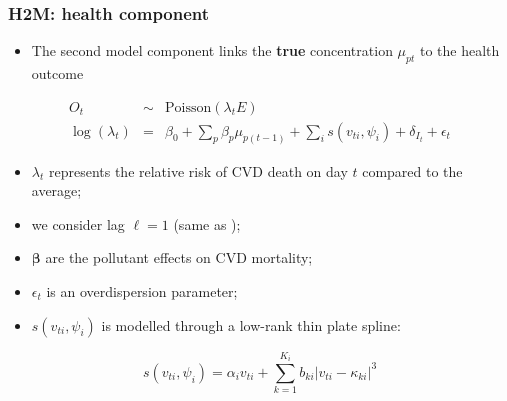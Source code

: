 \documentclass[slidestop,compress,serif,10pt]{beamer}
\begin{document}
\begin{frame}
\frametitle{H2M: health component}
\begin{itemize}
\item The second model component links the \textbf{true} concentration $\mu_{pt}$ to the health outcome
\end{itemize}
\begin{eqnarray*}
O_t &\sim& \text{Poisson}(\lambda_t E)\\
\log(\lambda_{t})&=& \beta_0 + \sum_p \beta_p \mu_{p(t-1)} + \sum_i s(v_{ti}, \psi_i) + \delta_{I_t} + \epsilon_t
\end{eqnarray*}

\begin{itemize}
\item $\lambda_t$ represents the relative risk of CVD death on day $t$ compared to the average;
\item we consider lag $\ell=1$ (same as \citealt{Atkinson:2016});
\item $\boldsymbol{\beta}$ are the pollutant effects on CVD mortality;
\item $\epsilon_t$ is an overdispersion parameter;
\item $ s(v_{ti}, \psi_i)$ is modelled through a low-rank thin plate spline:	
\end{itemize}
\[s(v_{ti}, \psi_{i})= \alpha_{i} v_{ti} + \sum_{k=1}^{K_{i}} b_{ki} | v_{ti}-\kappa_{ki}|^3
\]
\end{frame}
%
\end{document}
